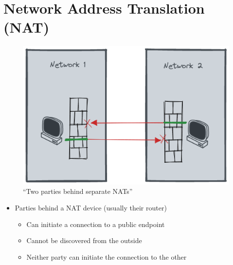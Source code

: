 \hypertarget{network-address-translation-nat}{%
\chapter{Network Address Translation
(NAT)}\label{network-address-translation-nat}}

\begin{figure}
\centering
\includegraphics[width=\textwidth,height=0.66\textheight]{presentation/../figures/nat-intro.png}
\caption{``Two parties behind separate NATs''\label{nat-intro}}
\end{figure}

\begin{itemize}
\tightlist
\item
  Parties behind a NAT device (usually their router)

  \begin{itemize}
  \tightlist
  \item
    Can initiate a connection to a public endpoint
  \item
    Cannot be discovered from the outside
  \item
    Neither party can initiate the connection to the other
  \end{itemize}
\end{itemize}
